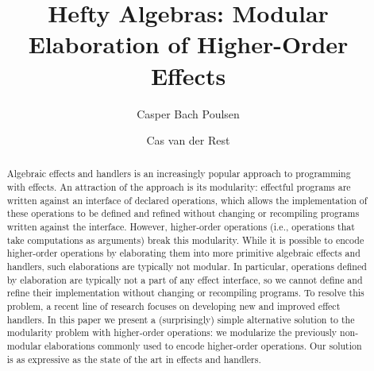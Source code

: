 \documentclass[draft]{jfp}
\begin{document}
\raggedbottom

\title{Hefty Algebras: Modular Elaboration of Higher-Order Effects}
% 
% 
%

\begin{authgrp}
\author{Casper Bach Poulsen}
\author{Cas van der Rest}
\end{authgrp}

\begin{abstract}
  Algebraic effects and handlers is an increasingly popular approach to
  programming with effects.  An attraction of the approach is its modularity:
  effectful programs are written against an interface of declared operations,
  which allows the implementation of these operations to be defined and refined
  without changing or recompiling programs written against the interface.
  However, higher-order operations (i.e., operations that take computations as
  arguments) break this modularity.  While it is possible to encode higher-order
  operations by elaborating them into more primitive algebraic effects and
  handlers, such elaborations are typically not modular.  In particular,
  operations defined by elaboration are typically not a part of any effect
  interface, so we cannot define and refine their implementation without
  changing or recompiling programs.  To resolve this problem, a recent line of
  research focuses on developing new and improved effect handlers.  In this
  paper we present a (surprisingly) simple alternative solution to the
  modularity problem with higher-order operations: we modularize the previously
  non-modular elaborations commonly used to encode higher-order operations.  Our
  solution is as expressive as the state of the art in effects and handlers.
\end{abstract}
\end{document}
